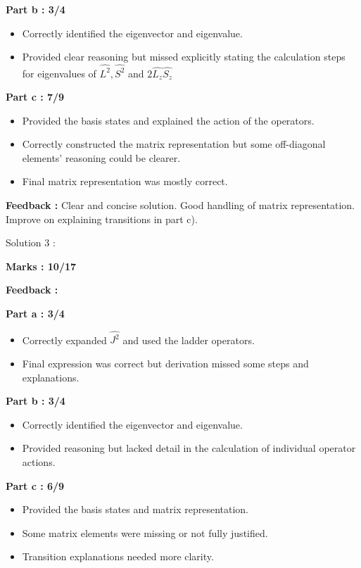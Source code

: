 \documentclass[a4paper,11pt]{article}
\begin{document}
\textbf{Part b : 3/4}

\begin{itemize}
    \item Correctly identified the eigenvector and eigenvalue.
    \item Provided clear reasoning but missed explicitly stating the calculation steps for eigenvalues of $\hat{L^2}, \hat{S^2}$ and $2\hat{L_z}\hat{S_z}$
\end{itemize}


\textbf{Part c : 7/9}

\begin{itemize}
    \item Provided the basis states and explained the action of the operators.
    \item Correctly constructed the matrix representation but some off-diagonal elements' reasoning could be clearer.
    \item Final matrix representation was mostly correct.
\end{itemize}

\textbf{Feedback :}
Clear and concise solution. Good handling of matrix representation. Improve on explaining transitions in part c).



Solution 3 :

\textbf{Marks : 10/17}

\textbf{Feedback : }

\textbf{Part a : 3/4}

\begin{itemize}
    \item Correctly expanded $\hat{J^2}$ and used the ladder operators.
    \item Final expression was correct but derivation missed some steps and explanations.
\end{itemize}


\textbf{Part b : 3/4}

\begin{itemize}
    \item Correctly identified the eigenvector and eigenvalue.
    \item Provided reasoning but lacked detail in the calculation of individual operator actions.
\end{itemize}


\textbf{Part c : 6/9}

\begin{itemize}
    \item Provided the basis states and matrix representation.
    \item Some matrix elements were missing or not fully justified.
    \item Transition explanations needed more clarity.
\end{itemize}
\end{document}

